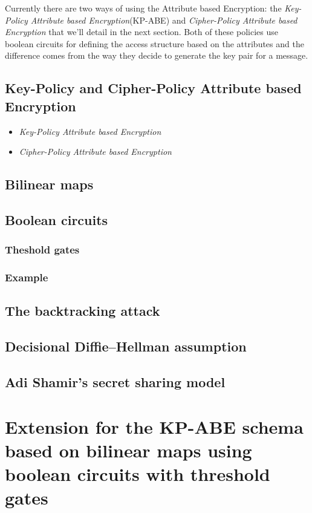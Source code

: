 \documentclass[12pt]{article}
\begin{document}
Currently there are two ways of using the Attribute based Encryption: the \textit{Key-Policy Attribute based Encryption}(KP-ABE) and \textit{Cipher-Policy Attribute based Encryption} that we'll detail in the next section. Both of these policies use boolean circuits for defining the access structure based on the attributes and the difference comes from the way they decide to generate the key pair for a message.

\subsection{Key-Policy and Cipher-Policy Attribute based Encryption}

\begin{itemize}
  \item \textit{Key-Policy Attribute based Encryption}
  \item \textit{Cipher-Policy Attribute based Encryption}
\end{itemize}

\subsection{Bilinear maps}
\subsection{Boolean circuits}
\subsubsection{Theshold gates}
\subsubsection{Example}
\subsection{The backtracking attack}
\subsection{Decisional Diffie–Hellman assumption}
\subsection{Adi Shamir's secret sharing model}

\section{Extension for the KP-ABE schema based on bilinear maps using boolean circuits with threshold gates}
\end{document}
